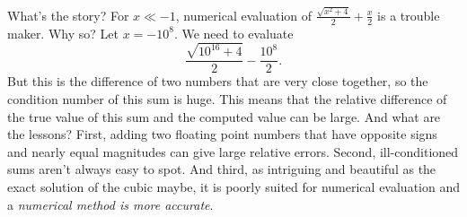 \documentclass[12pt,fleqn]{exam}
\begin{document}
 What's the story? For $x \ll -1$, numerical evaluation of $\frac{\sqrt{{{x}^{2}}+4}}{2}+\frac{x}{2}$ is a trouble
 maker.  Why so? Let $x = -10^8$. We need to evaluate
 \begin{equation}
 \frac{\sqrt{10^{16}+4}}{2}-\frac{10^8}{2}.
\end{equation}
But this is the difference of two numbers that are very close together, so the condition number of this sum is huge.
This means that the relative difference of the true value of this sum and the computed value can be large.  
And what are the lessons? First, adding two floating point numbers that have opposite signs and nearly equal magnitudes
can give large relative errors. Second, ill-conditioned sums  aren't always easy to spot. And third, as intriguing and beautiful as the exact solution of the cubic maybe,
it is poorly suited for numerical evaluation and a \emph{numerical method is more accurate}. 




 
\end{document}
